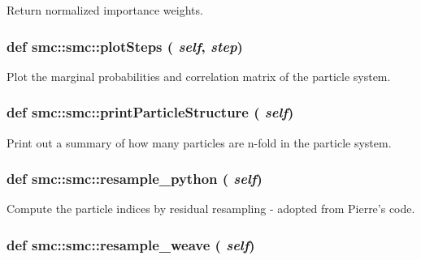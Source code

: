 Return normalized importance weights. 

\hypertarget{classsmc_1_1smc_462f5030ead3c90a3d7be5419a0539b6}{
\subsubsection[{plotSteps}]{\setlength{\rightskip}{0pt plus 5cm}def smc::smc::plotSteps ( {\em self}, \/   {\em step})}}
\label{classsmc_1_1smc_462f5030ead3c90a3d7be5419a0539b6}


Plot the marginal probabilities and correlation matrix of the particle system. 

\hypertarget{classsmc_1_1smc_485fc39676c507c373e922a124f51748}{
\subsubsection[{printParticleStructure}]{\setlength{\rightskip}{0pt plus 5cm}def smc::smc::printParticleStructure ( {\em self})}}
\label{classsmc_1_1smc_485fc39676c507c373e922a124f51748}


Print out a summary of how many particles are n-fold in the particle system. 

\hypertarget{classsmc_1_1smc_7af51336a53e7096b370af78e42e9cfa}{
\subsubsection[{resample\_\-python}]{\setlength{\rightskip}{0pt plus 5cm}def smc::smc::resample\_\-python ( {\em self})}}
\label{classsmc_1_1smc_7af51336a53e7096b370af78e42e9cfa}


Compute the particle indices by residual resampling - adopted from Pierre's code. 

\hypertarget{classsmc_1_1smc_75f94a2618bc58ed2cc419dc36817ff9}{
\subsubsection[{resample\_\-weave}]{\setlength{\rightskip}{0pt plus 5cm}def smc::smc::resample\_\-weave ( {\em self})}}
\label{classsmc_1_1smc_75f94a2618bc58ed2cc419dc36817ff9}


